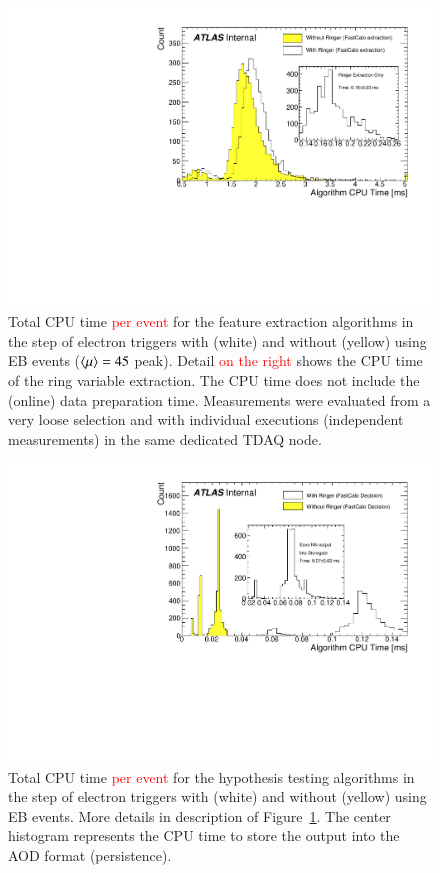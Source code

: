 \begin{figure}[h!tb]
	\includegraphics[width=.7\textwidth]{sections/operation/figures/EgammaFex_TotalTime}
	\centering
	\caption{\label{fig:fastcalo_fex_time}
		Total CPU time \textcolor{red}{per event} for the feature extraction algorithms in
		the \fastcalo step of electron triggers with (white) and without (yellow) \rnn{}
		using EB events ($\langle \mu \rangle=45$ peak). Detail \textcolor{red}{on the right}
		shows the CPU time of the ring variable extraction. The CPU time does not
		include the (online) data preparation time.  Measurements were evaluated from 
		a very loose selection 
		and with individual executions (independent measurements) in the same dedicated
		TDAQ node.
	}
\end{figure}

\begin{figure}[h!tb]
	\includegraphics[width=.7\textwidth]{sections/operation/figures/EgammaHypo_TotalTime.pdf}
	\centering
	\caption{\label{fig:fastcalo_hypo_time}
		Total CPU time \textcolor{red}{per event} for the hypothesis testing algorithms
		in the \fastcalo step of electron triggers with (white) and without (yellow) \rnn{}
		using EB events. More details in description of Figure~\ref{fig:fastcalo_fex_time}. 
		The center histogram represents the CPU time to store the \rnn{} output into the AOD 
		format (persistence).}
\end{figure}

